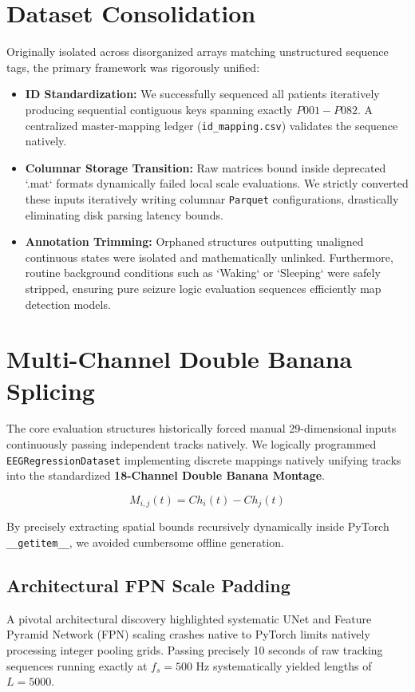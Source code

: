\documentclass[conference]{IEEEtran}
\begin{document}
\section{Dataset Consolidation}
Originally isolated across disorganized arrays matching unstructured sequence tags, the primary framework was rigorously unified:
\begin{itemize}
    \item \textbf{ID Standardization:} We successfully sequenced all patients iteratively producing sequential contiguous keys spanning exactly $P001 - P082$. A centralized master-mapping ledger (\texttt{id\_mapping.csv}) validates the sequence natively.
    \item \textbf{Columnar Storage Transition:} Raw matrices bound inside deprecated `.mat` formats dynamically failed local scale evaluations. We strictly converted these inputs iteratively writing columnar \texttt{Parquet} configurations, drastically eliminating disk parsing latency bounds.
    \item \textbf{Annotation Trimming:} Orphaned structures outputting unaligned continuous states were isolated and mathematically unlinked. Furthermore, routine background conditions such as `Waking` or `Sleeping` were safely stripped, ensuring pure seizure logic evaluation sequences efficiently map detection models.
\end{itemize}

\section{Multi-Channel Double Banana Splicing}
The core evaluation structures historically forced manual 29-dimensional inputs continuously passing independent tracks natively. We logically programmed \texttt{EEGRegressionDataset} implementing discrete mappings natively unifying tracks into the standardized \textbf{18-Channel Double Banana Montage}.

\begin{equation}
    M_{i,j}(t) = Ch_i(t) - Ch_j(t)
\end{equation}

By precisely extracting spatial bounds recursively dynamically inside PyTorch \texttt{\_\_getitem\_\_}, we avoided cumbersome offline generation. 

\subsection{Architectural FPN Scale Padding}
A pivotal architectural discovery highlighted systematic UNet and Feature Pyramid Network (FPN) scaling crashes native to PyTorch limits natively processing integer pooling grids. Passing precisely 10 seconds of raw tracking sequences running exactly at $f_s = 500$ Hz systematically yielded lengths of $L=5000$. 
\end{document}
